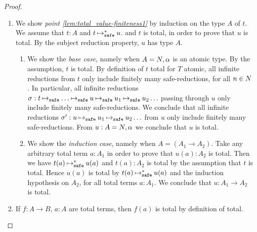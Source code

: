 \begin{proof}%
\begin{enumerate}
\item
  We show \emph{point \ref{lem:total_value-finiteness1}}  by induction on the type $A$ of $t$. 
  We assume that $t:A$ and $t \mathbin{\mathbin{\mapsto}_{\hbox{\scriptsize \tt safe}}^*} u$.
  and $t$ is total, in order to prove that $u$ is total.
  By the subject reduction property, $u$ has type $A$.
\begin{enumerate}
\item
  We show the \emph{base case}, namely when $A ={N},\alpha$ is an atomic type.
  By the assumption, $t$ is total.
  By definition of $t$ total for $T$ atomic, all infinite 
  reductions from $t$ only include finitely many safe-reductions, for all $n \in {N}$.
  In particular, all infinite reductions $\sigma: t \mathbin{\mathbin{\mapsto}_{\hbox{\scriptsize \tt safe}}} \ldots \mathbin{\mathbin{\mapsto}_{\hbox{\scriptsize \tt safe}}} 
  u \mathbin{\mathbin{\mapsto}_{\hbox{\scriptsize \tt safe}}} u_1 \mathbin{\mathbin{\mapsto}_{\hbox{\scriptsize \tt safe}}} u_2 \ldots$ 
  passing through $u$ only include finitely many safe-reductions. We conclude that
  all infinite reductions 
  $\sigma': u \mathbin{\mathbin{\mapsto}_{\hbox{\scriptsize \tt safe}}} u_1 \mathbin{\mathbin{\mapsto}_{\hbox{\scriptsize \tt safe}}} u_2 \ldots$  from $u$
  only include finitely many safe-reductions. 
  From $u:A ={N},\alpha$ we conclude that  $u$ is total.
  
\item
  We show the \emph{induction case}, namely when $A = (A_1\rightarrow A_2)$.
  Take any arbitrary total term $a:A_1$ in order to prove that $u(a):A_2$ is total. 
  Then we have $t(a) \mathbin{\mathbin{\mapsto}_{\hbox{\scriptsize \tt safe}}^*} u(a)$ and 
  $t(a):A_2$ is total by the assumption that $t$ is total.
  Hence $u(a)$ is total by $t(a) \mathbin{\mathbin{\mapsto}_{\hbox{\scriptsize \tt safe}}^*} u(a)$ and the induction hypothesis on $A_2$,
  for all total terms $a:A_1$. 
  We conclude that $u:A_1\rightarrow A_2$ is total. 
\end{enumerate}

  \item
If $f:A \rightarrow B$, $a:A$ are total  terms, then $f(a)$  is total by definition of total.


\end{enumerate}
\end{proof}
